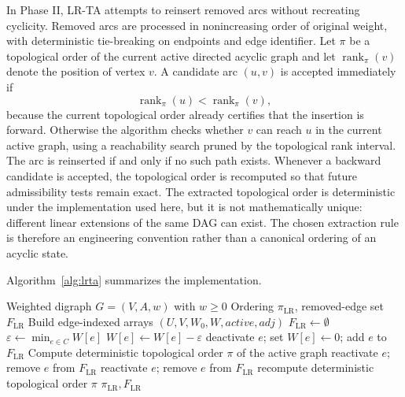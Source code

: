 In Phase II, LR-TA attempts to reinsert removed arcs without recreating cyclicity. Removed arcs are processed in nonincreasing order of original weight, with deterministic tie-breaking on endpoints and edge identifier. Let \(\pi\) be a topological order of the current active directed acyclic graph and let \(\operatorname{rank}_{\pi}(v)\) denote the position of vertex \(v\). A candidate arc \((u,v)\) is accepted immediately if
\begin{equation}
    \operatorname{rank}_{\pi}(u) < \operatorname{rank}_{\pi}(v),
    \label{eq:lrta-fast-accept}
\end{equation}
because the current topological order already certifies that the insertion is forward. Otherwise the algorithm checks whether \(v\) can reach \(u\) in the current active graph, using a reachability search pruned by the topological rank interval. The arc is reinserted if and only if no such path exists. Whenever a backward candidate is accepted, the topological order is recomputed so that future admissibility tests remain exact.
The extracted topological order is deterministic under the implementation used here, but it is not mathematically unique: different linear extensions of the same DAG can exist. The chosen extraction rule is therefore an engineering convention rather than a canonical ordering of an acyclic state.

Algorithm~\ref{alg:lrta} summarizes the implementation.

\begin{algorithm}[t]
\caption{LR-TA seed construction}
\label{alg:lrta}
\begin{algorithmic}[1]
\Require Weighted digraph \(G=(V,A,w)\) with \(w\ge 0\)
\Ensure Ordering \(\pi_{\mathrm{LR}}\), removed-edge set \(F_{\mathrm{LR}}\)
\State Build edge-indexed arrays \((U,V,W_0,W,\textit{active},\textit{adj})\)
\State \(F_{\mathrm{LR}} \gets \emptyset\)
    \State \(\varepsilon \gets \min_{e\in C} W[e]\)
        \State \(W[e] \gets W[e] - \varepsilon\)
            \State deactivate \(e\); set \(W[e]\gets 0\); add \(e\) to \(F_{\mathrm{LR}}\)
        \EndIf
    \EndFor
\EndWhile
\State Compute deterministic topological order \(\pi\) of the active graph
        \State reactivate \(e\); remove \(e\) from \(F_{\mathrm{LR}}\)
        \State reactivate \(e\); remove \(e\) from \(F_{\mathrm{LR}}\)
        \State recompute deterministic topological order \(\pi\)
    \EndIf
\EndFor
\State \Return \(\pi_{\mathrm{LR}}, F_{\mathrm{LR}}\)
\end{algorithmic}
\end{algorithm}

